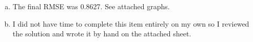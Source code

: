 \documentclass[12pt,letterpaper]{hmcpset}
\begin{document}
\begin{solution}
\begin{enumerate}[(a)]
		\item
		The final RMSE was 0.8627. See attached graphs.
		\item
		I did not have time to complete this item entirely on my own so I reviewed the solution and wrote it by hand on the attached sheet.

		
	\end{enumerate}
	\vfill
\end{solution}
\newpage
\end{document}
